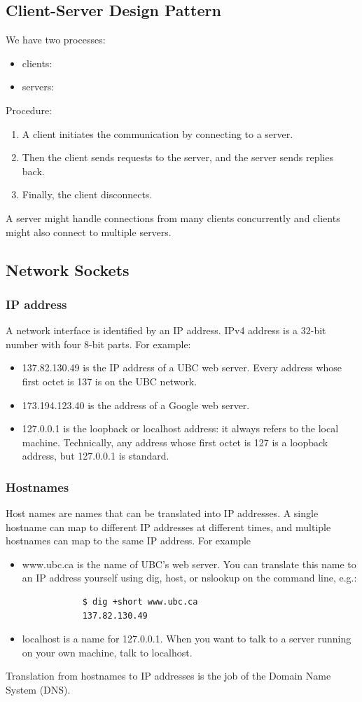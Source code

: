 \documentclass[letterpaper,12pt]{article}
\begin{document}
\subsection{Client-Server Design Pattern}
We have two processes:\begin{itemize}
      \item clients:
      \item servers:
\end{itemize}
Procedure: \begin{enumerate}
      \item A client initiates the communication by connecting to a server.
      \item Then the client sends requests to the server, and the server sends replies back.
      \item Finally, the client disconnects.
\end{enumerate}
A server might handle connections from many clients concurrently and clients might also connect to multiple servers.

\subsection{Network Sockets}
\subsubsection{IP address}
A network interface is identified by an IP address. IPv4 address is a 32-bit number with four 8-bit parts. For example:\begin{itemize}
      \item 137.82.130.49 is the IP address of a UBC web server. Every address whose first octet is 137 is on the UBC network.
      \item 173.194.123.40 is the address of a Google web server.
      \item 127.0.0.1 is the loopback or localhost address: it always refers to the local machine. Technically, any address whose first octet is 127 is a loopback address, but 127.0.0.1 is standard.
\end{itemize}
\subsubsection{Hostnames}
Host names are names that can be translated into IP addresses. A single hostname can map to different IP addresses at different times, and multiple hostnames can map to the same IP address. For example\begin{itemize}
      \item www.ubc.ca is the name of UBC's web server. You can translate this name to an IP address yourself using dig, host, or nslookup on the command line, e.g.:\begin{lstlisting}
            $ dig +short www.ubc.ca
            137.82.130.49
      \end{lstlisting}
      \item localhost is a name for 127.0.0.1. When you want to talk to a server running on your own machine, talk to localhost.
\end{itemize}
Translation from hostnames to IP addresses is the job of the Domain Name System (DNS).
\end{document}
